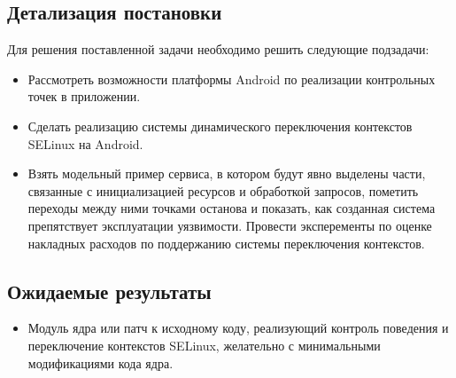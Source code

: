 \subsection{Детализация постановки}
Для решения поставленной задачи необходимо решить следующие подзадачи:
\begin{itemize}
\item Рассмотреть возможности платформы Android по реализации
    контрольных точек в приложении.
\item Сделать реализацию системы динамического переключения контекстов
    SELinux на Android.
\item Взять модельный пример сервиса, в котором будут явно выделены
    части, связанные с инициализацией ресурсов и обработкой запросов,
    пометить переходы между ними точками останова и показать, как
    созданная система препятствует эксплуатации уязвимости. Провести
    эксперементы по оценке накладных расходов по поддержанию системы
    переключения контекстов.
\end{itemize}

\subsection{Ожидаемые результаты}
\begin{itemize}
\item Модуль ядра или патч к исходному коду, реализующий контроль
    поведения и переключение контекстов SELinux, желательно с
    минимальными модификациями кода ядра.
\end{itemize}
